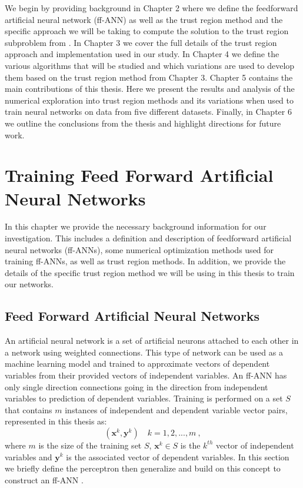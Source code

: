 \documentclass[letterpaper,12pt,titlepage,oneside,final]{book}
\begin{document}
	We begin by providing background in Chapter 2 where we define the feedforward artificial neural network (ff-ANN) as well as the trust region method and the specific approach we will be taking to compute the solution to the trust region subproblem from \cite{adachi.paper}. In Chapter 3 we cover the full details of the trust region approach and implementation used in our study. In Chapter 4 we define the various algorithms that will be studied and which variations are used to develop them based on the trust region method from Chapter 3. Chapter 5 contains the main contributions of this thesis. Here we present the results and analysis of the numerical exploration into trust region methods and its variations when used to train neural networks on data from five different datasets. Finally, in Chapter 6 we outline the conclusions from the thesis and highlight directions for future work. 
	
	
	\chapter{Training Feed Forward Artificial Neural Networks}
	
	In this chapter we provide the necessary background information for our investigation. This includes a definition and description of feedforward artificial neural networks (ff-ANNs), some numerical optimization methods used for training ff-ANNs, as well as trust region methods. In addition, we provide the details of the specific trust region method we will be using in this thesis to train our networks.
	
	\section{Feed Forward Artificial Neural Networks}
	An artificial neural network is a set of artificial neurons attached to each other in a network using weighted connections. This type of network can be used as a machine learning model and trained to approximate vectors of dependent variables from their provided vectors of independent variables. An ff-ANN has only single direction connections going in the direction from independent variables to prediction of dependent variables. Training is performed on a set $S$ that contains $m$ instances of independent and dependent variable vector pairs, represented in this thesis as:
	\begin{equation}
	(\mathbf{x}^{k},\mathbf{y}^{k}) \quad  k = 1,2, ..., m \ , 
	\label{equation:training_example}
	\end{equation} 
	where $m$ is the size of the training set $S$, $\mathbf{x}^{k} \in S$ is the $k^{th}$ vector of independent variables and $\mathbf{y}^{k}$ is the associated vector of dependent variables. In this section we briefly define the perceptron then generalize and build on this concept to construct an ff-ANN .
	
\end{document}
